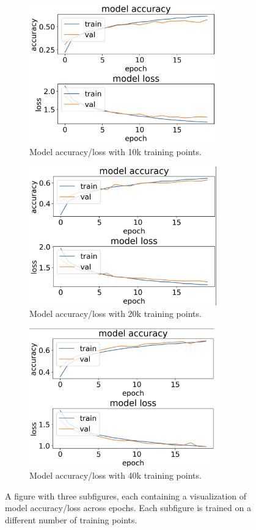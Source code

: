 \documentclass{article}
\begin{document}
\begin{figure} [H]
\centering
\begin{subfigure}{.49\linewidth}
  \centering
  \includegraphics[width=\linewidth, height=6cm]{10k.png}
  \caption{Model accuracy/loss with 10k training points.}
  \label{fig:sub1}
\end{subfigure}%
\begin{subfigure}{.49\textwidth}
  \centering
  \includegraphics[width=\linewidth, height=6cm]{20k.png}
  \caption{Model accuracy/loss with 20k training points.}
  \label{fig:sub2}
\end{subfigure}
\label{fig:test}
\begin{subfigure}{.5\linewidth}
  \centering
  \includegraphics[width=\linewidth, height=6cm]{40k.png}
  \caption{Model accuracy/loss with 40k training points.}
  \label{fig:sub3}
\end{subfigure}%
\caption{A figure with three subfigures, each containing a visualization of model accuracy/loss across epochs. Each subfigure is trained on a different number of training points. }
\label{fig:test}
\end{figure}
\end{document}
